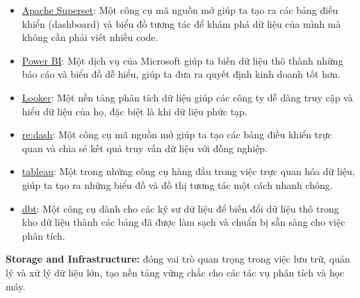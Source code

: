 \documentclass[11pt]{article}
\begin{document}
\begin{itemize}
\item \href{https://superset.apache.org/}{Apache Superset}: Một công cụ mã nguồn mở giúp ta tạo ra các bảng điều khiển (dashboard) và biểu đồ tương tác để khám phá dữ liệu của mình mà không cần phải viết nhiều code.
\item \href{https://powerbi.microsoft.com/en-us/}{Power BI}: Một dịch vụ của Microsoft giúp ta biến dữ liệu thô thành những báo cáo và biểu đồ dễ hiểu, giúp ta đưa ra quyết định kinh doanh tốt hơn.
\item \href{https://looker.com/}{Looker}: Một nền tảng phân tích dữ liệu giúp các công ty dễ dàng truy cập và hiểu dữ liệu của họ, đặc biệt là khi dữ liệu phức tạp.
\item \href{https://redash.io/}{re:dash}: Một công cụ mã nguồn mở giúp ta tạo các bảng điều khiển trực quan và chia sẻ kết quả truy vấn dữ liệu với đồng nghiệp.
\item \href{https://www.tableau.com/}{tableau}: Một trong những công cụ hàng đầu trong việc trực quan hóa dữ liệu, giúp ta tạo ra những biểu đồ và đồ thị tương tác một cách nhanh chóng.
\item \href{https://www.getdbt.com/}{dbt}: Một công cụ dành cho các kỹ sư dữ liệu để biến đổi dữ liệu thô trong kho dữ liệu thành các bảng đã được làm sạch và chuẩn bị sẵn sàng cho việc phân tích.
\end{itemize}

\noindent\textbf{Storage and Infrastructure:} đóng vai trò quan trọng trong việc lưu trữ, quản lý và xử lý dữ liệu lớn, tạo nền tảng vững chắc cho các tác vụ phân tích và học máy.
\end{document}
